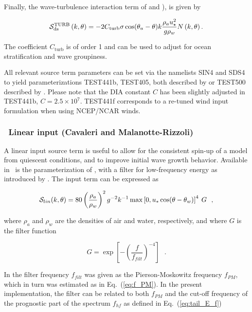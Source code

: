 Finally, the wave-turbulence interaction term of \cite{art:TB02} and \cite{art:AJ06}),
is given by

\begin{equation}
{\cal S}_{\mathrm{ds}}^{\mathrm{TURB}}\left(k,\theta\right) = - 2
C_{\mathrm{turb}} \sigma \cos(\theta_u - \theta) k \frac{\rho_a
u_\star^2}{g \rho_w}  N\left(k,\theta\right) .
\end{equation}

\noindent
The coefficient $C_{\mathrm{turb}}$ is of order 1 and can be used to adjust for
ocean stratification and wave groupiness.


\noindent
All relevant source term parameters can be set via the namelists SIN4 and SDS4
to yield parameterizations TEST441b, TEST405, 
both described by \cite{art:Aea10}  or TEST500 described by \cite{art:FA11}. Please note that 
the DIA constant $C$ has been slightly adjusted in TEST441b, $C=2.5\times 10^7$. TEST441f corresponds 
to a re-tuned wind input formulation when using NCEP/NCAR winds. 

\vsssub
\subsubsection{~Linear input (Cavaleri and Malanotte-Rizzoli)} \label{sec:c&mr}
\vsssub

A linear input source term is useful to allow for the consistent spin-up of a
model from quiescent conditions, and to improve initial wave growth
behavior. Available in \ws\ is the parameterization of \cite{art:CMR81}, with
a filter for low-frequency energy as introduced by \cite{tol:JPO92}. The input
term can be expressed as

\begin{equation}
{\cal S}_{lin}(k,\theta) = 80 \left( \frac{\rho_a}{\rho_w} \right ) ^2
  g^{-2}  k^{-1} \max \left [ 0 , u_* \cos (\theta - \theta_w) \right ]^4 \: G
   \:\:\: , \label{eq:CMR81}
\end{equation}

\noindent
where $\rho_a$ and $\rho_w$ are the densities of air and water, respectively,
and where $G$ is the filter function

\begin{equation}
G = \exp \left [ - \left ( \frac{f}{f_{filt}} \right ) ^{-4} \right ]
\:\:\: . \label{eq:GSln}
\end{equation}

\noindent
In \cite {tol:JPO92} the filter frequency $f_{filt}$ was given as the
Pierson-Moskowitz frequency $f_{PM}$, which in turn was estimated as in
Eq.~(\ref{eq:f_PM}).  In the present implementation, the filter can be related
to both $f_{PM}$ and the cut-off frequency of the prognostic part of the
spectrum $f_{hf}$ as defined in Eq.~(\ref{eq:tail_E_f})

